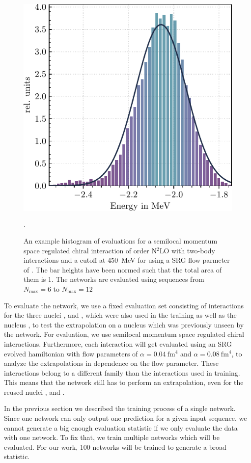 \begin{figure}
  \centering
  \includegraphics[width=.5\textwidth]{media/example_histogram.pdf}
  \caption{An example histogram of evaluations for a semilocal momentum space regulated chiral interaction of order N$^{2}$LO with two-body interactions and a cutoff at \SI{450}{\mega\electronvolt} for  using a SRG flow parmeter of  \cite{smsquelle}. The bar heights have been normed such that the total area of them is 1. The networks are evaluated using sequences from $N_\mathrm{max}=6$ to $N_\mathrm{max}=12$}.
  \label{fig:example_histogram}
\end{figure}
To evaluate the network, we use a fixed evaluation set consisting of interactions for the three nuclei ,  and , which were also used in the training as well as the nucleus , to test the extrapolation on a nucleus which was previously unseen by the network. For evaluation, we use semilocal momentum space regulated chiral interactions. Furthermore, each interaction will get evaluated using an SRG evolved hamiltonian with flow parameters of $\alpha = \SI{0.04}{\femto\metre^4}$ and $\alpha = \SI{0.08}{\femto\metre^4}$, to analyze the extrapolations in dependence on the flow parameter. These interactions belong to a different family than the interactions used in training. This means that the network still has to perform an extrapolation, even for the reused nuclei ,  and .


In the previous section we described the training process of a single network. Since one network can only output one prediction for a given input sequence, we cannot generate a big enough evaluation statistic if we only evaluate the data with one network. To fix that, we train multiple networks which will be evaluated. For our work, 100 networks will be trained to generate a broad statistic.


